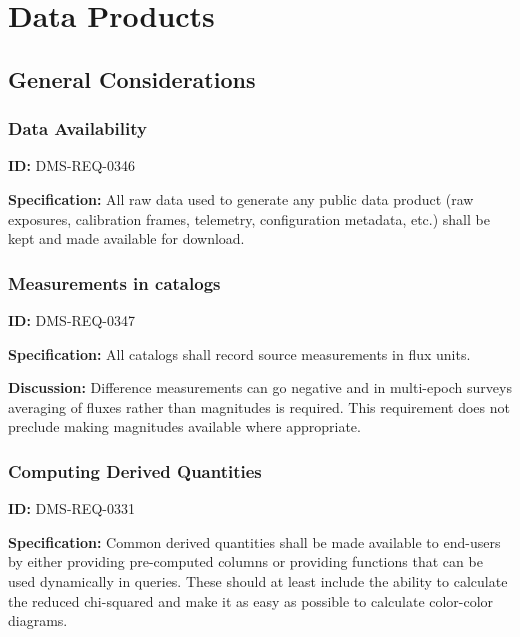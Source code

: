 \documentclass[SE,toc,lsstdraft]{lsstdoc}
\begin{document}
\section{Data Products}





\subsection{General Considerations}





\subsubsection{Data Availability}

\label{DMS-REQ-0346}
\textbf{ID:} DMS-REQ-0346

\textbf{Specification: }All raw data used to generate any public data product (raw exposures, calibration frames, telemetry, configuration metadata, etc.) shall be kept and made available for download.






\subsubsection{Measurements in catalogs}

\label{DMS-REQ-0347}
\textbf{ID:} DMS-REQ-0347

\textbf{Specification: }All catalogs shall record source measurements in flux units.

\textbf{Discussion: }Difference measurements can go negative and in multi-epoch surveys averaging of fluxes rather than magnitudes is required. This requirement does not preclude making magnitudes available where appropriate.




\subsubsection{Computing Derived Quantities}

\label{DMS-REQ-0331}
\textbf{ID:} DMS-REQ-0331

\textbf{Specification:} Common derived quantities shall be made available to end-users by either providing pre-computed columns or providing functions that can be used dynamically in queries. These should at least include the ability to calculate the reduced chi-squared and make it as easy as possible to calculate color-color diagrams.
\end{document}
